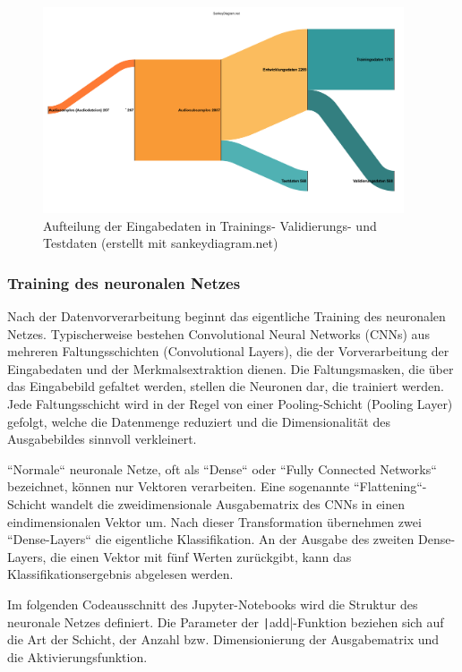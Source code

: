 \begin{figure}[h!]
\centering
\includegraphics[width=0.95\textwidth]{images/08_durchfuehrung/nn/input-data-graph.png}
\caption{Aufteilung der Eingabedaten in Trainings- Validierungs- und Testdaten (erstellt mit sankeydiagram.net)}
\label{fig:img-input-data-graph}
\end{figure}

\subsubsection{Training des neuronalen Netzes}

Nach der Datenvorverarbeitung beginnt das eigentliche Training des neuronalen Netzes. Typischerweise bestehen Convolutional Neural Networks (CNNs) aus mehreren Faltungsschichten (Convolutional Layers), die der Vorverarbeitung der Eingabedaten und der Merkmalsextraktion dienen. Die Faltungsmasken, die über das Eingabebild gefaltet werden, stellen die Neuronen dar, die trainiert werden. Jede Faltungsschicht wird in der Regel von einer Pooling-Schicht (Pooling Layer) gefolgt, welche die Datenmenge reduziert und die Dimensionalität des Ausgabebildes sinnvoll verkleinert. \cite{how-cnn-work}

``Normale`` neuronale Netze, oft als ``Dense`` oder ``Fully Connected Networks`` bezeichnet, können nur Vektoren verarbeiten. Eine sogenannte ``Flattening``-Schicht wandelt die zweidimensionale Ausgabematrix des CNNs in einen eindimensionalen Vektor um. Nach dieser Transformation übernehmen zwei ``Dense-Layers`` die eigentliche Klassifikation. An der Ausgabe des zweiten Dense-Layers, die einen Vektor mit fünf Werten zurückgibt, kann das Klassifikationsergebnis abgelesen werden. \cite{how-cnn-work}

Im folgenden Codeausschnitt des Jupyter-Notebooks wird die Struktur des neuronale Netzes definiert. Die Parameter der \texttt|add|-Funktion beziehen sich auf die Art der Schicht, der Anzahl bzw. Dimensionierung der Ausgabematrix und die Aktivierungsfunktion.

